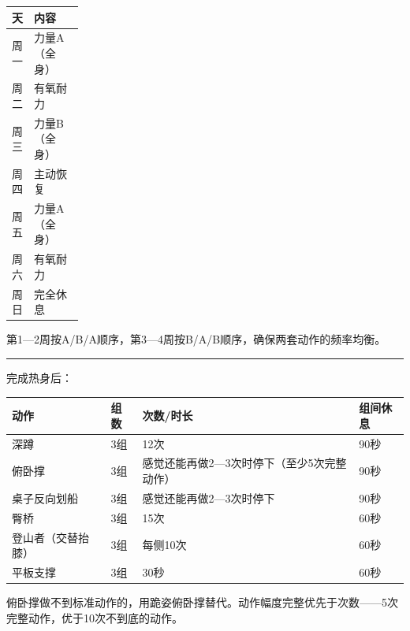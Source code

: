 \documentclass[UTF8,zihao=-4,oneside]{ctexart}
\newcommand{\BookMinorTitle}[1]{%
  \par\vspace{0.35em}{\sffamily\large\bfseries\color{TitleInk}#1}\par\vspace{0.15em}%
}
\begin{document}
\begin{table}[H]
\centering
\footnotesize
\renewcommand{\arraystretch}{1.24}
\begin{tabularx}{\linewidth}{@{}>{\RaggedRight\arraybackslash}p{0.18\linewidth}>{\RaggedRight\arraybackslash}X@{}}
\toprule
\textbf{天} & \textbf{内容} \\
\midrule
周一 & 力量A（全身） \\
周二 & 有氧耐力 \\
周三 & 力量B（全身） \\
周四 & 主动恢复 \\
周五 & 力量A（全身） \\
周六 & 有氧耐力 \\
周日 & 完全休息 \\
\bottomrule
\end{tabularx}
\end{table}


第1—2周按A/B/A顺序，第3—4周按B/A/B顺序，确保两套动作的频率均衡。

\vspace{0.35em}\noindent\textcolor{RuleInk}{\rule{\linewidth}{0.35pt}}\vspace{0.35em}

\BookMinorTitle{力量A（全身）}

完成热身后：

\begin{table}[H]
\centering
\footnotesize
\renewcommand{\arraystretch}{1.18}
\begin{tabularx}{\linewidth}{@{}>{\RaggedRight\arraybackslash}X>{\RaggedRight\arraybackslash}X>{\RaggedRight\arraybackslash}X>{\RaggedRight\arraybackslash}X@{}}
\toprule
\textbf{动作} & \textbf{组数} & \textbf{次数/时长} & \textbf{组间休息} \\
\midrule
深蹲 & 3组 & 12次 & 90秒 \\
俯卧撑 & 3组 & 感觉还能再做2—3次时停下（至少5次完整动作） & 90秒 \\
桌子反向划船 & 3组 & 感觉还能再做2—3次时停下 & 90秒 \\
臀桥 & 3组 & 15次 & 60秒 \\
登山者（交替抬膝） & 3组 & 每侧10次 & 60秒 \\
平板支撑 & 3组 & 30秒 & 60秒 \\
\bottomrule
\end{tabularx}
\end{table}


\begin{BookCallout}[colback=blueBack,colframe=blueLine,overlay={\node[CalloutLabel,fill=blueTag] at ([xshift=3.5mm,yshift=-0.4mm]frame.north west) {要点};}]
俯卧撑做不到标准动作的，用跪姿俯卧撑替代。动作幅度完整优先于次数——5次完整动作，优于10次不到底的动作。
\end{BookCallout}
\end{document}
